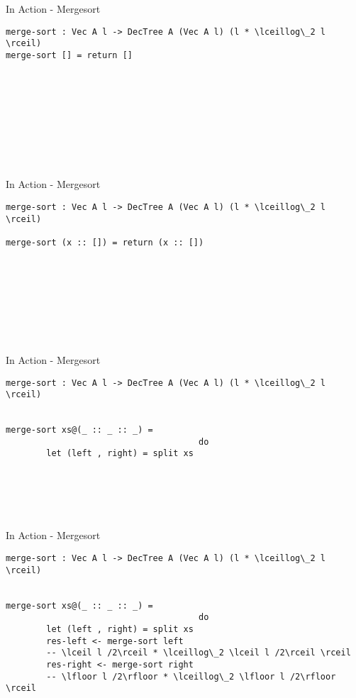 \documentclass[11pt]{beamer}
\begin{document}
    \begin{frame}[fragile]{In Action - Mergesort}
        \begin{lstlisting}[emph={merge,sort,bound,split,return},showlines=true]
merge-sort : Vec A l -> DecTree A (Vec A l) (l * \lceillog\_2 l \rceil)
merge-sort [] = return []










        \end{lstlisting}
    \end{frame}

    \begin{frame}[fragile]{In Action - Mergesort}
        \begin{lstlisting}[emph={merge,sort,bound,split,return},showlines=true]
merge-sort : Vec A l -> DecTree A (Vec A l) (l * \lceillog\_2 l \rceil)

merge-sort (x :: []) = return (x :: [])









        \end{lstlisting}
    \end{frame}

    \begin{frame}[fragile]{In Action - Mergesort}
        \begin{lstlisting}[emph={merge,sort,bound,split,return},showlines=true]
merge-sort : Vec A l -> DecTree A (Vec A l) (l * \lceillog\_2 l \rceil)


merge-sort xs@(_ :: _ :: _) =
                                      do
        let (left , right) = split xs






        \end{lstlisting}
    \end{frame}

    \begin{frame}[fragile]{In Action - Mergesort}
        \begin{lstlisting}[emph={merge,sort,bound,split,return},showlines=true]
merge-sort : Vec A l -> DecTree A (Vec A l) (l * \lceillog\_2 l \rceil)


merge-sort xs@(_ :: _ :: _) =
                                      do
        let (left , right) = split xs
        res-left <- merge-sort left
        -- \lceil l /2\rceil * \lceillog\_2 \lceil l /2\rceil \rceil
        res-right <- merge-sort right
        -- \lfloor l /2\rfloor * \lceillog\_2 \lfloor l /2\rfloor \rceil


        \end{lstlisting}
    \end{frame}
\end{document}

